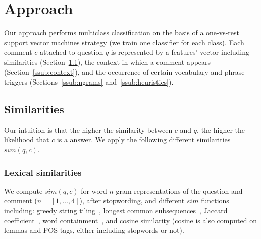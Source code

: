 \section{Approach}
\label{sec:approach}

Our approach performs multiclass classification on the basis of a one-vs-rest 
support vector machines strategy (\ie we train one classifier for each class). 
Each comment $c$ attached to question $q$ is represented by a features' vector 
including similarities (Section~\ref{sub:sim}), the context in which a comment 
appears (Section~\ref{ssub:context}), and the occurrence of certain vocabulary 
and phrase triggers (Sections~\ref{ssub:ngrams} and~\ref{ssub:heuristics}). 

% 

\subsection{Similarities}
\label{sub:sim}

Our intuition is that the higher the similarity between $c$ and $q$, the 
higher the likelihood that $c$ is a \good answer. We apply the following 
different similarities $sim(q,c)$.

\subsubsection{Lexical similarities }

We compute $sim(q, c)$ for word $n$-gram representations of the question and 
comment ($n=[1,\ldots,4]$), after stopwording, and different $sim$ functions 
including: greedy string tiling~\cite{Wise:1996}, longest common 
subsequences~\cite{Allison:1986}, Jaccard coefficient~\cite{Jaccard:1901}, word 
containment~\cite{Lyon:2001}, and cosine similarity (cosine is also computed on 
lemmas and POS tags, either including stopwords or not).

